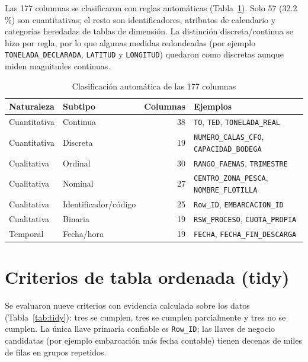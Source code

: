 \documentclass[11pt,a4paper]{article}
\begin{document}
Las 177 columnas se clasificaron con reglas automáticas (Tabla~\ref{tab:clasif}). Solo 57 (32.2\,\%) son cuantitativas; el resto son identificadores, atributos de calendario y categorías heredadas de tablas de dimensión. La distinción discreta/continua se hizo por regla, por lo que algunas medidas redondeadas (por ejemplo \texttt{TONELADA\_DECLARADA}, \texttt{LATITUD} y \texttt{LONGITUD}) quedaron como discretas aunque miden magnitudes continuas.

\begin{table}[h!]
\centering
\caption{Clasificación automática de las 177 columnas}
\label{tab:clasif}
\begin{tabular}{llrl}
\toprule
\textbf{Naturaleza} & \textbf{Subtipo} & \textbf{Columnas} & \textbf{Ejemplos} \\
\midrule
Cuantitativa & Continua            & 38 & \texttt{TO}, \texttt{TED}, \texttt{TONELADA\_REAL} \\
Cuantitativa & Discreta            & 19 & \texttt{NUMERO\_CALAS\_CFO}, \texttt{CAPACIDAD\_BODEGA} \\
Cualitativa  & Ordinal             & 30 & \texttt{RANGO\_FAENAS}, \texttt{TRIMESTRE} \\
Cualitativa  & Nominal             & 27 & \texttt{CENTRO\_ZONA\_PESCA}, \texttt{NOMBRE\_FLOTILLA} \\
Cualitativa  & Identificador/código & 25 & \texttt{Row\_ID}, \texttt{EMBARCACION\_ID} \\
Cualitativa  & Binaria             & 19 & \texttt{RSW\_PROCESO}, \texttt{CUOTA\_PROPIA} \\
Temporal     & Fecha/hora          & 19 & \texttt{FECHA}, \texttt{FECHA\_FIN\_DESCARGA} \\
\bottomrule
\end{tabular}
\end{table}

\section{Criterios de tabla ordenada (tidy)}

Se evaluaron nueve criterios con evidencia calculada sobre los datos (Tabla~\ref{tab:tidy}): tres se cumplen, tres se cumplen parcialmente y tres no se cumplen. La única llave primaria confiable es \texttt{Row\_ID}; las llaves de negocio candidatas (por ejemplo embarcación más fecha contable) tienen decenas de miles de filas en grupos repetidos.
\end{document}
